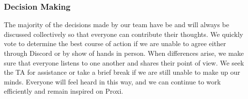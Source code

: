 \documentclass{article}
\begin{document}
\subsubsection*{Decision Making} 

The majority of the decisions made by our team have be and will always be discussed collectively so that everyone can contribute their thoughts.  
We quickly vote to determine the best course of action if we are unable to agree either through Discord or 
by show of hands in person.  When differences arise, we make sure that everyone listens to one another and 
shares their point of view.  We seek the TA for assistance or take a brief break if we are still unable to make up our minds.  
Everyone will feel heard in this way, and we can continue to work efficiently and remain inspired on Proxi.
\end{document}
